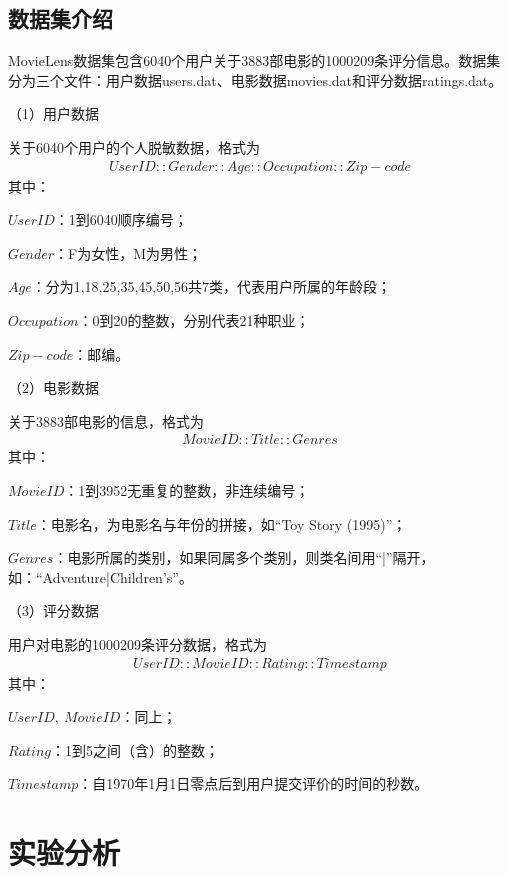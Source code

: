 \subsection{数据集介绍}
\xiaosi\begin{spacing}{1.5}
MovieLens数据集包含6040个用户关于3883部电影的1000209条评分信息。数据集分为三个文件：用户数据users.dat、电影数据movies.dat和评分数据ratings.dat。\par
（1）用户数据\par
关于6040个用户的个人脱敏数据，格式为
{\setlength\abovedisplayskip{1pt}
\setlength\belowdisplayskip{1pt}
\begin{align}
UserID::Gender::Age::Occupation::Zip-code
\nonumber\end{align}
}
其中：\par
$UserID$：1到6040顺序编号；\par
$Gender$：F为女性，M为男性；\par
$Age$：分为1,18,25,35,45,50,56共7类，代表用户所属的年龄段；\par
$Occupation$：0到20的整数，分别代表21种职业；\par
$Zip-code$：邮编。\par
（2）电影数据\par
关于3883部电影的信息，格式为
{\setlength\abovedisplayskip{1pt}
\setlength\belowdisplayskip{1pt}
\begin{align}
MovieID::Title::Genres
\nonumber\end{align}
}
其中：\par
$MovieID$：1到3952无重复的整数，非连续编号；\par
$Title$：电影名，为电影名与年份的拼接，如“Toy Story (1995)”；\par
$Genres$：电影所属的类别，如果同属多个类别，则类名间用“|”隔开，如：“Adventure|Children's”。\par
（3）评分数据\par
用户对电影的1000209条评分数据，格式为
{\setlength\abovedisplayskip{1pt}
\setlength\belowdisplayskip{1pt}
\begin{align}
UserID::MovieID::Rating::Timestamp
\nonumber\end{align}
}
其中：\par
$UserID,\ MovieID$：同上；\par
$Rating$：1到5之间（含）的整数；\par
$Timestamp$：自1970年1月1日零点后到用户提交评价的时间的秒数。
\end{spacing}


\clearpage
\section{实验分析}
